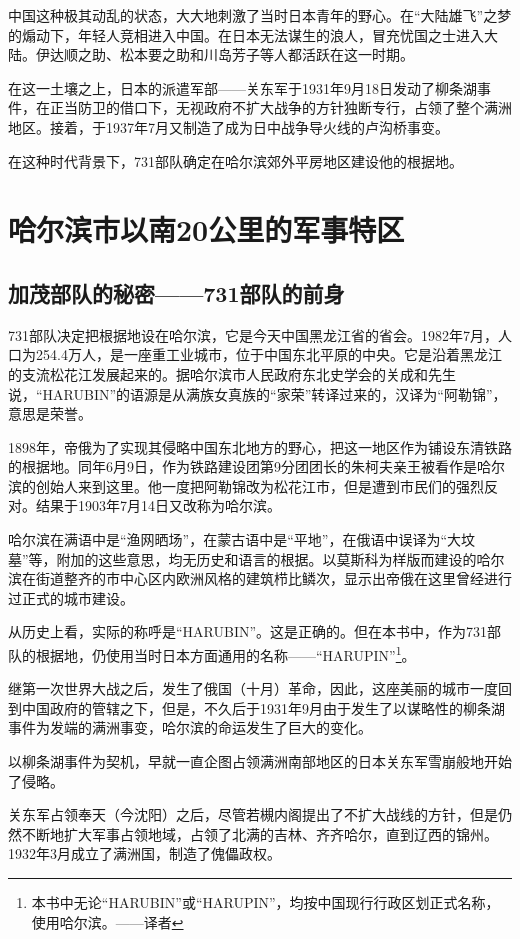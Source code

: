 \documentclass[a4paper,12pt,UTF8,twoside]{ctexbook}
\begin{document}
中国这种极其动乱的状态，大大地刺激了当时日本青年的野心。在“大陆雄飞”之梦的煽动下，年轻人竞相进入中国。在日本无法谋生的浪人，冒充忧国之士进入大陆。伊达顺之助、松本要之助和川岛芳子等人都活跃在这一时期。

在这一土壤之上，日本的派遣军部——关东军于1931年9月18日发动了柳条湖事件，在正当防卫的借口下，无视政府不扩大战争的方针独断专行，占领了整个满洲地区。接着，于1937年7月又制造了成为日中战争导火线的卢沟桥事变。

在这种时代背景下，731部队确定在哈尔滨郊外平房地区建设他的根据地。

\mainmatter

\chapter{哈尔滨市以南20公里的军事特区}

\section{加茂部队的秘密——731部队的前身}
731部队决定把根据地设在哈尔滨，它是今天中国黑龙江省的省会。1982年7月，人口为254.4万人，是一座重工业城市，位于中国东北平原的中央。它是沿着黑龙江的支流松花江发展起来的。据哈尔滨市人民政府东北史学会的关成和先生说，“HARUBIN”的语源是从满族女真族的“家荣”转译过来的，汉译为“阿勒锦”，意思是荣誉。

1898年，帝俄为了实现其侵略中国东北地方的野心，把这一地区作为铺设东清铁路的根据地。同年6月9日，作为铁路建设团第9分团团长的朱柯夫亲王被看作是哈尔滨的创始人来到这里。他一度把阿勒锦改为松花江市，但是遭到市民们的强烈反对。结果于1903年7月14日又改称为哈尔滨。

哈尔滨在满语中是“渔网晒场”，在蒙古语中是“平地”，在俄语中误译为“大坟墓”等，附加的这些意思，均无历史和语言的根据。以莫斯科为样版而建设的哈尔滨在街道整齐的市中心区内欧洲风格的建筑栉比鳞次，显示出帝俄在这里曾经进行过正式的城市建设。

从历史上看，实际的称呼是“HARUBIN”。这是正确的。但在本书中，作为731部队的根据地，仍使用当时日本方面通用的名称——“HARUPIN”\footnote{本书中无论“HARUBIN”或“HARUPIN”，均按中国现行行政区划正式名称，使用哈尔滨。——译者}。

继第一次世界大战之后，发生了俄国（十月）革命，因此，这座美丽的城市一度回到中国政府的管辖之下，但是，不久后于1931年9月由于发生了以谋略性的柳条湖事件为发端的满洲事变，哈尔滨的命运发生了巨大的变化。

以柳条湖事件为契机，早就一直企图占领满洲南部地区的日本关东军雪崩般地开始了侵略。

关东军占领奉天（今沈阳）之后，尽管若槻内阁提出了不扩大战线的方针，但是仍然不断地扩大军事占领地域，占领了北满的吉林、齐齐哈尔，直到辽西的锦州。1932年3月成立了满洲国，制造了傀儡政权。
\end{document}
